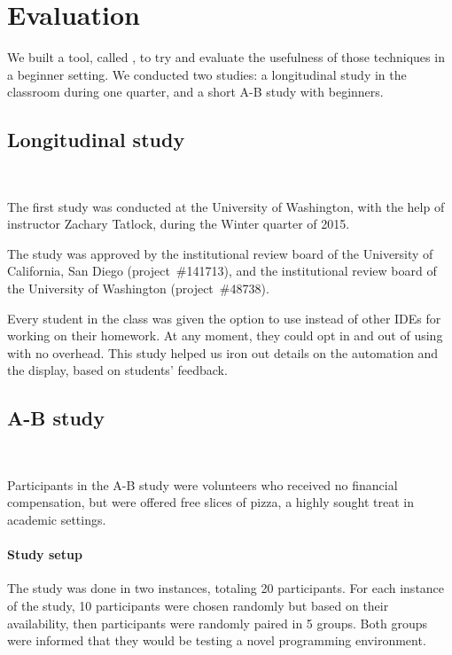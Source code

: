 \section{Evaluation}

We built a tool, called \PeaCoq{}, to try and evaluate the usefulness of those
techniques in a beginner setting.  We conducted two studies: a longitudinal
study in the classroom during one quarter, and a short A-B study with beginners.

\subsection{Longitudinal study}~\label{peacoq-longitudinal-study}

The first study was conducted at the University of Washington, with the help of
instructor Zachary Tatlock, during the Winter quarter of 2015.

The study was approved by the institutional review board of the University of
California, San Diego (project~\#141713), and the institutional review board of
the University of Washington (project~\#48738).

Every student in the class was given the option to use \PeaCoq{} instead of
other IDEs for working on their homework.  At any moment, they could opt in and
out of using \PeaCoq{} with no overhead.  This study helped us iron out details
on the automation and the display, based on students' feedback.


\subsection{A-B study}~\label{peacoq-a-b-study}

Participants in the A-B study were volunteers who received no financial
compensation, but were offered free slices of pizza, a highly sought treat in
academic settings.

\paragraph{Study setup}

The study was done in two instances, totaling 20 participants.  For each
instance of the study, 10 participants were chosen randomly but based on their
availability, then participants were randomly paired in 5 groups.  Both groups
were informed that they would be testing a novel programming environment.

